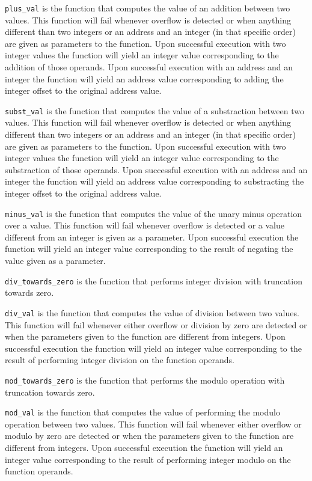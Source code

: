 \verb|plus_val| is the function that computes the value of an addition between two values.
This function will fail whenever overflow is detected or when anything different than two integers or an address and an integer (in that specific order) are given as parameters to the function.
Upon successful execution with two integer values the function will yield an integer value corresponding to the addition of those operands.
Upon successful execution with an address and an integer the function will yield an address value corresponding to adding the integer offset to the original address value.

\verb|subst_val| is the function that computes the value of a substraction between two values.
This function will fail whenever overflow is detected or when anything different than two integers or an address and an integer (in that specific order) are given as parameters to the function.
Upon successful execution with two integer values the function will yield an integer value corresponding to the substraction of those operands.
Upon successful execution with an address and an integer the function will yield an address value corresponding to substracting the integer offset to the original address value.

\verb|minus_val| is the function that computes the value of the unary minus operation over a value.
This function will fail whenever overflow is detected or a value different from an integer is given as a parameter.
Upon successful execution the function will yield an integer value corresponding to the result of negating the value given as a parameter.

\verb|div_towards_zero| is the function that performs integer division with truncation towards zero.

\verb|div_val| is the function that computes the value of division between two values.
This function will fail whenever either overflow or division by zero are detected or when the parameters given to the function are different from integers.
Upon successful execution the function will yield an integer value corresponding to the result of performing integer division on the function operands.

\verb|mod_towards_zero| is the function that performs the modulo operation with truncation towards zero.

\verb|mod_val| is the function that computes the value of performing the modulo operation between two values.
This function will fail whenever either overflow or modulo by zero are detected or when the parameters given to the function are different from integers.
Upon successful execution the function will yield an integer value corresponding to the result of performing integer modulo on the function operands.

